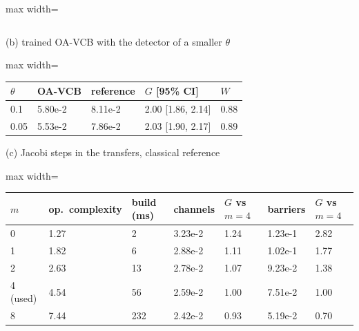 \begin{table}[tbp]
\begin{adjustbox}{max width=\linewidth}
\begin{tabular}{llllll}
\bottomrule\end{tabular}
\end{adjustbox}
\par\medskip
{\small (b) trained OA-VCB with the detector of a smaller $\theta$}\par\smallskip
\begin{adjustbox}{max width=\linewidth}
\begin{tabular}{lllll}\toprule
$\theta$ & OA-VCB & reference & $G$ [95\% CI] & $W$ \\\midrule
0.1 & 5.80e-2 & 8.11e-2 & 2.00 [1.86, 2.14] & 0.88 \\
0.05 & 5.53e-2 & 7.86e-2 & 2.03 [1.90, 2.17] & 0.89 \\
\bottomrule\end{tabular}
\end{adjustbox}
\par\medskip
{\small (c) Jacobi steps in the transfers, classical reference}\par\smallskip
\begin{adjustbox}{max width=\linewidth}
\begin{tabular}{lllllll}\toprule
$m$ & op.\ complexity & build (ms) & channels & $G$ vs $m=4$ & barriers & $G$ vs $m=4$ \\\midrule
0 & 1.27 & 2 & 3.23e-2 & 1.24 & 1.23e-1 & 2.82 \\
1 & 1.82 & 6 & 2.88e-2 & 1.11 & 1.02e-1 & 1.77 \\
2 & 2.63 & 13 & 2.78e-2 & 1.07 & 9.23e-2 & 1.38 \\
4 (used) & 4.54 & 56 & 2.59e-2 & 1.00 & 7.51e-2 & 1.00 \\
8 & 7.44 & 232 & 2.42e-2 & 0.93 & 5.19e-2 & 0.70 \\
\bottomrule\end{tabular}
\end{adjustbox}
\end{table}

